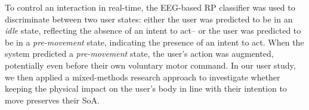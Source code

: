 
To control an interaction in real-time, the EEG-based RP classifier was used to discriminate between two user states: either the user was predicted to be in an \textit{idle} state, reflecting the absence of an intent to act-- or the user was predicted to be in a \textit{pre-movement} state, indicating the presence of an intent to act. When the system predicted a \textit{pre-movement} state, the user's action was augmented, potentially even before their own voluntary motor command. In our user study, we then applied a mixed-methods research approach to investigate whether keeping the physical impact on the user's body in line with their intention to move preserves their SoA.








